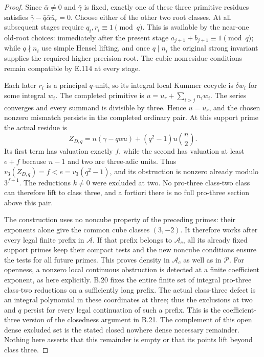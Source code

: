 \begin{proof}
Since $\bar\alpha\ne0$ and $\bar\gamma$ is fixed, exactly one
of these three primitive residues satisfies
$\bar\gamma-\bar q\bar\alpha\bar u_r=0$.
Choose either of the other two root classes. At all subsequent
stages require $q_i,r_i\equiv1\pmod q$. This is available by the
near-one old-root choices: immediately after the present stage
$a_{j+1}+b_{j+1}\equiv1\pmod q$; while $q\nmid n_i$ use
simple Hensel lifting, and once $q\mid n_i$ the original strong
invariant supplies the required higher-precision root. The cubic
nonresidue conditions remain compatible by E.114 at every stage.

Each later $r_i$ is a principal $q$-unit, so its integral local
Kummer cocycle is $\delta w_i$ for some integral $w_i$.
The completed primitive is
$u=u_r+\sum_{i>j}n_iw_i$. The series converges and every summand
is divisible by three. Hence $\bar u=\bar u_r$, and the chosen
nonzero mismatch persists in the completed ordinary pair.
At this support prime the actual residue is
\[
 Z_{D,q}=n(\gamma-q\alpha u)
               +(q^2-1)u\binom n2.
\]
Its first term has valuation exactly $f$, while the second has
valuation at least $e+f$ because $n-1$ and two are three-adic
units. Thus $v_3(Z_{D,q})=f<e=v_3(q^2-1)$, and its obstruction
is nonzero already modulo $3^{f+1}$. The reductions $k\ne0$
were excluded at two. No pro-three class-two class can therefore
lift to class three, and a fortiori there is no full pro-three
section above this pair.

The construction uses no noncube property of the preceding primes:
their exponents alone give the common cube classes $(3,-2)$.
It therefore works after every legal finite prefix in $\mathscr A$.
If that prefix belongs to $\mathscr A_c$, all its already fixed
support primes keep their compact tests and the new noncube
conditions ensure the tests for all future primes. This proves
density in $\mathscr A_c$ as well as in $\mathscr P$.
For openness, a nonzero local continuous obstruction is
detected at a finite coefficient exponent, as here explicitly.
B.20 fixes the entire finite set of integral pro-three class-two
reductions on a sufficiently long prefix. The actual class-three
defect is an integral polynomial in these coordinates at three;
thus the exclusions at two and $q$ persist for every legal
continuation of such a prefix. This is the coefficient-three
version of the closedness argument in B.21. The complement of
this open dense excluded set is the stated closed nowhere dense
necessary remainder. Nothing here asserts that this remainder is
empty or that its points lift beyond class three.
\end{proof}

